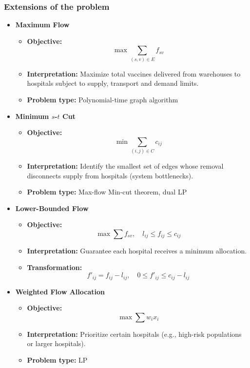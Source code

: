 \documentclass[12pt, openany]{article}
\begin{document}
\subsubsection{Extensions of the problem}
\begin{itemize}

\item \textbf{Maximum Flow}
\begin{itemize}
\item \textbf{Objective:} 
\[
\max \sum_{(s,v)\in E} f_{sv}
\]
\item \textbf{Interpretation:} Maximize total vaccines delivered from warehouses to hospitals subject to supply, transport and demand limits.
\item \textbf{Problem type:} Polynomial-time graph algorithm
\end{itemize}

\item \textbf{Minimum $s$-$t$ Cut}
\begin{itemize}
\item \textbf{Objective:}
\[
\min \sum_{(i,j)\in C} c_{ij}
\]
\item \textbf{Interpretation:} Identify the smallest set of edges whose removal disconnects supply from hospitals (system bottlenecks).
\item \textbf{Problem type:} Max-flow Min-cut theorem, dual LP
\end{itemize}

\item \textbf{Lower-Bounded Flow}
\begin{itemize}
\item \textbf{Objective:}
\[
\max \sum f_{sv}, \quad l_{ij} \le f_{ij} \le c_{ij}
\]
\item \textbf{Interpretation:} Guarantee each hospital receives a minimum allocation.
\item \textbf{Transformation:}
\[
f'_{ij} = f_{ij} - l_{ij}, \quad 0 \le f'_{ij} \le c_{ij} - l_{ij}
\]
\end{itemize}

\item \textbf{Weighted Flow Allocation}
\begin{itemize}
\item \textbf{Objective:}
\[
\max \sum w_i x_i
\]
\item \textbf{Interpretation:} Prioritize certain hospitals (e.g., high-risk populations or larger hospitals).
\item \textbf{Problem type:} LP
\end{itemize}


\end{itemize}
\end{document}
